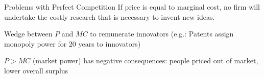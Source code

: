 \documentclass[notes,11pt, aspectratio=169, xcolor=table]{beamer}
\newenvironment{wideitemize}{\itemize\addtolength{\itemsep}{10pt}}{\enditemize}
\begin{document}
\begin{frame}{Problems with Perfect Competition}
\Large If price is equal to marginal cost, no firm will undertake the costly research that is
necessary to invent new ideas.
\vspace{20pt}

\normalsize

\begin{wideitemize}
    \item Wedge between $P$ and $MC$ to remunerate innovators (e.g.: Patents assign monopoly power for 20 years to innovators)
    \item  $P > MC$ (market power) has negative consequences: people priced out of market, lower overall surplus
\end{wideitemize}
    
\end{frame}
\end{document}
